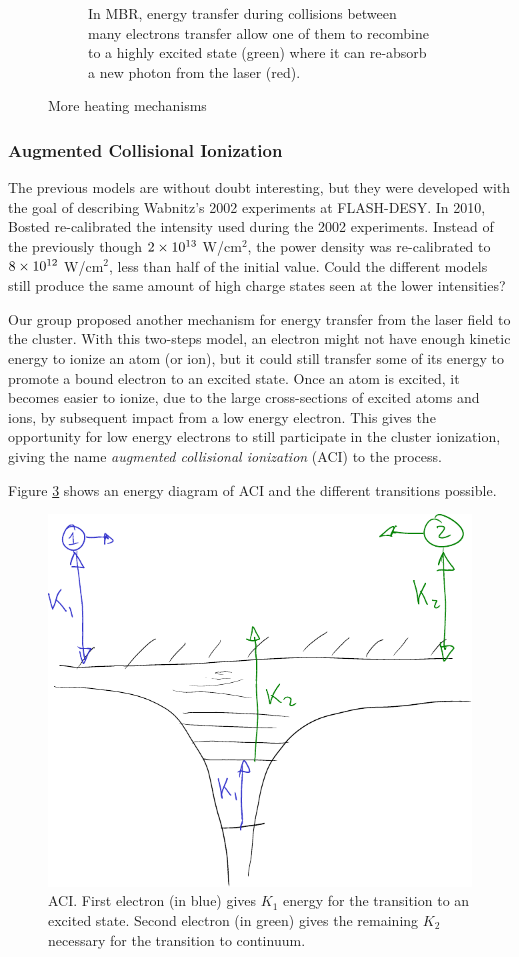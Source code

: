\begin{figure}
\begin{subfigure}{0.48\columnwidth}
        \caption{In MBR, energy transfer during collisions between many
                 electrons transfer allow one of them to recombine to a highly
                 excited state (green) where it can re-absorb a new photon from
                 the laser (red).}
        \label{fig:heating:mbr}
    \end{subfigure}
 \caption{More heating mechanisms}
 \label{fig:heating}
\end{figure}


\subsubsection{Augmented Collisional Ionization}
The previous models are without doubt interesting, but they were developed with
the goal of describing Wabnitz's 2002 experiments at FLASH-DESY. In 2010, Bosted
re-calibrated the intensity used during the 2002 experiments.
Instead of the previously though $\ten{2}{13}$ W/cm$^2$, the power density was
re-calibrated to $\ten{8}{12}$ W/cm$^2$, less than half of the initial value.
Could the different models still produce the same amount of high charge states
seen at the lower intensities?

Our group proposed another mechanism for energy transfer from the laser field
to the cluster. With this two-steps model, an electron might not have enough
kinetic energy to ionize an atom (or ion), but it could still transfer some of
its energy to promote a bound electron to an excited state. Once an atom is
excited, it becomes easier to ionize, due to the large cross-sections of excited
atoms and ions, by subsequent impact from a low energy electron. This gives the
opportunity for low energy electrons to still participate in the cluster
ionization, giving the name \textit{augmented collisional ionization} (ACI) to
the process.

Figure \ref{fig:ionization:aci} shows an energy diagram of ACI and the
different transitions possible.
\begin{figure}
 \centering
 \includegraphics[width=0.38\columnwidth]{figures/mockups/ionization_aci}
 \caption{ACI. First electron (in blue) gives $K_1$ energy for the transition
          to an excited state. Second electron (in green) gives the remaining
          $K_2$ necessary for the transition to continuum.}
 \label{fig:ionization:aci}
\end{figure}

